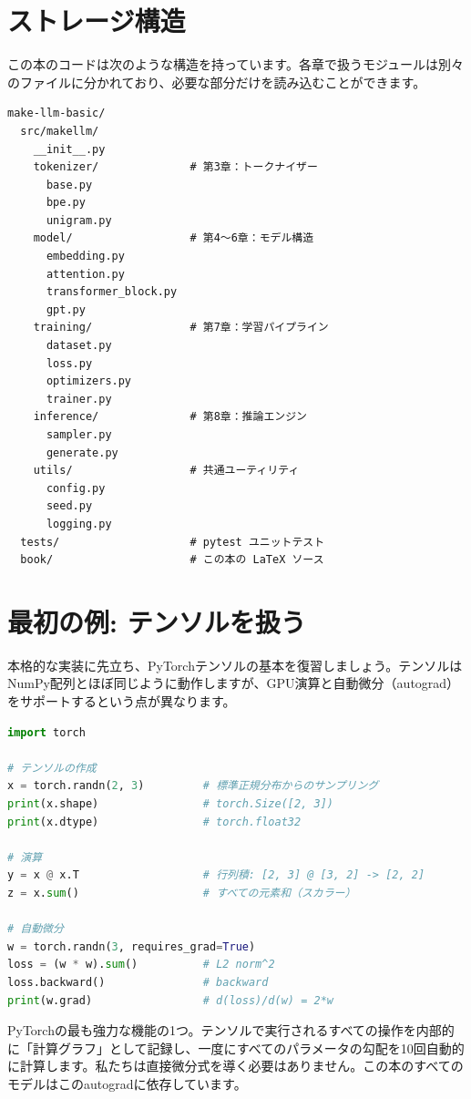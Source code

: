 \section{ストレージ構造}

この本のコードは次のような構造を持っています。各章で扱うモジュールは別々のファイルに分かれており、必要な部分だけを読み込むことができます。

\begin{lstlisting}[style=bashstyle]
make-llm-basic/
  src/makellm/
    __init__.py
    tokenizer/              # 第3章：トークナイザー
      base.py
      bpe.py
      unigram.py
    model/                  # 第4〜6章：モデル構造
      embedding.py
      attention.py
      transformer_block.py
      gpt.py
    training/               # 第7章：学習パイプライン
      dataset.py
      loss.py
      optimizers.py
      trainer.py
    inference/              # 第8章：推論エンジン
      sampler.py
      generate.py
    utils/                  # 共通ユーティリティ
      config.py
      seed.py
      logging.py
  tests/                    # pytest ユニットテスト
  book/                     # この本の LaTeX ソース
\end{lstlisting}

\section{最初の例: テンソルを扱う}

本格的な実装に先立ち、PyTorchテンソルの基本を復習しましょう。テンソルはNumPy配列とほぼ同じように動作しますが、GPU演算と自動微分（autograd）をサポートするという点が異なります。

\begin{lstlisting}[language=Python]
import torch

# テンソルの作成
x = torch.randn(2, 3)         # 標準正規分布からのサンプリング
print(x.shape)                # torch.Size([2, 3])
print(x.dtype)                # torch.float32

# 演算
y = x @ x.T                   # 行列積: [2, 3] @ [3, 2] -> [2, 2]
z = x.sum()                   # すべての元素和（スカラー）

# 自動微分
w = torch.randn(3, requires_grad=True)
loss = (w * w).sum()          # L2 norm^2
loss.backward()               # backward
print(w.grad)                 # d(loss)/d(w) = 2*w
\end{lstlisting}

\begin{infobox}
PyTorchの最も強力な機能の1つ。テンソルで実行されるすべての操作を内部的に「計算グラフ」として記録し、一度にすべてのパラメータの勾配を10回自動的に計算します。私たちは直接微分式を導く必要はありません。この本のすべてのモデルはこのautogradに依存しています。
\end{infobox}

